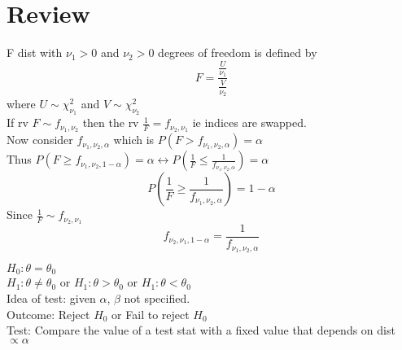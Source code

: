 \documentclass[answers,12pt,addpoints]{exam}
\begin{document}
\newpage
\section*{Review}
\begin{definition}[F distribution]
    F dist with $\nu_1 > 0$ and $\nu_2 > 0$ degrees of freedom is defined by
    $$F = \frac{\frac{U}{\nu_1}}{\frac{V}{\nu_2}}$$
    where $U \sim \chi^2_{\nu_1}$ and $V \sim \chi^2_{\nu_2}$\\
    If rv $F \sim f_{\nu_1, \nu_2}$ then the rv $\frac{1}{F} = f_{\nu_2, \nu_1}$ ie indices are swapped.\\
    Now consider $f_{\nu_1, \nu_2, \alpha} $ which is $P(F > f_{\nu_1, \nu_2, \alpha}) = \alpha$\\
    Thus $P(F \geq f_{\nu_1, \nu_2, 1 - \alpha}) = \alpha \leftrightarrow P(\frac{1}{F} \leq \frac{1}{f_{\nu_1, \nu_2, \alpha}}) = \alpha$\\
    $$ P(\frac{1}{F} \geq \frac{1}{f_{\nu_1, \nu_2,\alpha}}) = 1- \alpha$$
    Since $\frac{1}{F} \sim f_{\nu_2, \nu_1}$
    $$ f_{\nu_2, \nu_1, 1 - \alpha} = \frac{1}{f_{\nu_1, \nu_2, \alpha}}$$
\end{definition}

\begin{definition}
    $H_0: \theta = \theta_0$\\ 
    $H_1: \theta \neq \theta_0$ or $H_1: \theta > \theta_0$ or $H_1: \theta < \theta_0$\\
    Idea of test: given $\alpha$, $\beta$ not specified. \\
    Outcome: Reject $H_0$ or Fail to reject $H_0$\\ 
    Test: Compare the value of a test stat with a fixed value that depends on dist $\propto \alpha$
\end{definition}
\end{document}

